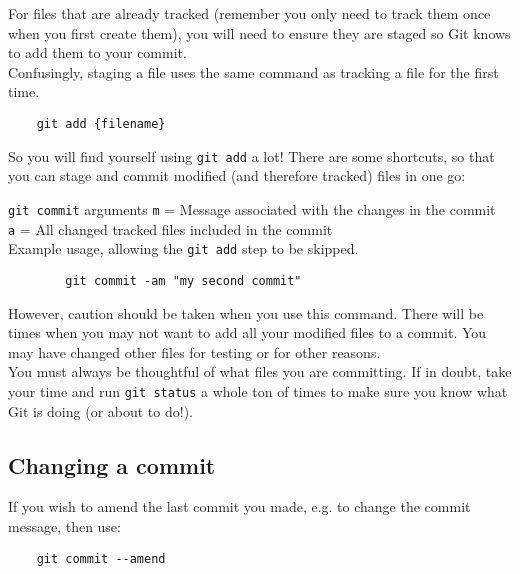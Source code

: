 For files that are already tracked (remember you only need to track them once when you first create them), you will need to ensure they are staged so Git knows to add them to your commit.
\\

Confusingly, staging a file uses the same command as tracking a file for the first time.
\\

\begin{verbatim}
    git add {filename}
\end{verbatim}

So you will find yourself using \texttt{git add} a lot! There are some shortcuts, so that you can stage and commit modified (and therefore tracked) files in one go:

\begin{infobox}{\texttt{git commit} arguments}
    \texttt{m} = Message associated with the changes in the commit
    \\
    \texttt{a} = All changed tracked files included in the commit
    \\

    Example usage, allowing the \texttt{git add} step to be skipped.

    \begin{verbatim}
        git commit -am "my second commit"
    \end{verbatim}
\end{infobox}

However, caution should be taken when you use this command. There will be times when you may not want to add all your modified files to a commit. You may have changed other files for testing or for other reasons.
\\

You must always be thoughtful of what files you are committing. If in doubt, take your time and run \texttt{git status} a whole ton of times to make sure you know what Git is doing (or about to do!).

\subsection{Changing a commit}

If you wish to amend the last commit you made, e.g. to change the commit message, then use:

\begin{verbatim}
    git commit --amend
\end{verbatim}



